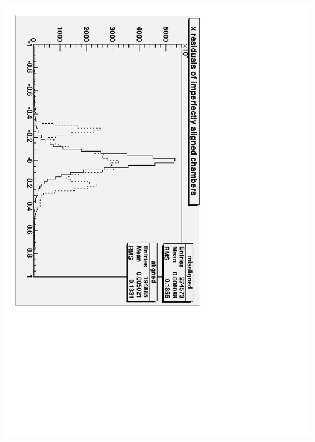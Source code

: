 \documentclass[compress]{beamer}
\begin{document}
\begin{frame}
\begin{columns}
\includegraphics[height=1.2\linewidth, angle=90]{inthetails.pdf}
\end{columns}
\end{frame}
\end{document}
